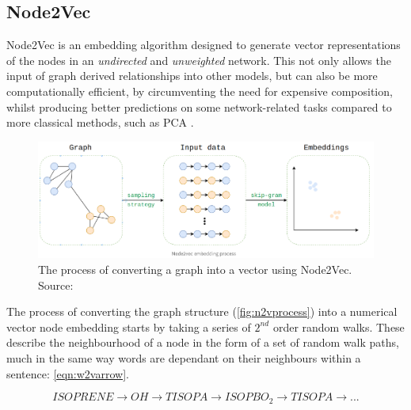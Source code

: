 \subsection{Node2Vec}\label{sec:n2v}
 Node2Vec is an embedding algorithm designed to generate vector representations of the nodes in an \textit{undirected} and \textit{unweighted} network. This not only allows the input of graph derived relationships into other models, but can also be more computationally efficient, by circumventing the need for expensive composition, whilst producing better predictions on some network-related tasks compared to more classical methods, such as PCA \cite{node2vec}.


\begin{figure}[H]
  \centering
\includegraphics[width=\textwidth]{4fig/n2vproc.png}
\caption{The process of converting a graph into a vector using Node2Vec. Source:\cite{n2vimg}}\label{fig:n2vprocess}
\end{figure}


The process of converting the graph structure (\autoref{fig:n2vprocess}) into a numerical vector node embedding starts by taking a series of $2^{nd}$ order random walks. These describe the neighbourhood of a node in the form of a set of random walk paths, much in the same way words are dependant on their neighbours within a sentence: \autoref{eqn:w2varrow}.


\begin{equation}
ISOPRENE \rightarrow OH \rightarrow TISOPA \rightarrow ISOPBO_2 \rightarrow TISOPA \rightarrow...
\label{eqn:w2varrow}
\end{equation}


